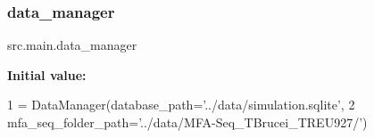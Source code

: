 \subsubsection{\texorpdfstring{data\+\_\+manager}{data\_manager}}
{\footnotesize\ttfamily src.\+main.\+data\+\_\+manager}

{\bfseries Initial value\+:}
\begin{DoxyCode}
1 =  DataManager(database\_path=\textcolor{stringliteral}{'../data/simulation.sqlite'},
2                  mfa\_seq\_folder\_path=\textcolor{stringliteral}{'../data/MFA-Seq\_TBrucei\_TREU927/'})
\end{DoxyCode}

